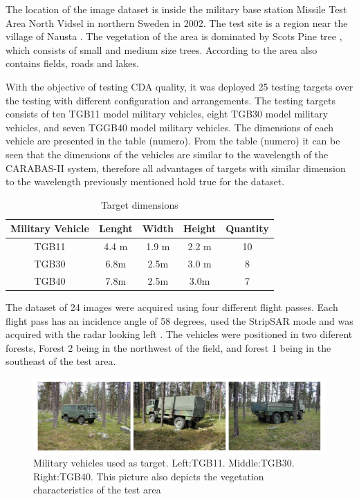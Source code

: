 The location of the image dataset is inside the military base station Missile Test Area North
Vidsel in northern Sweden in 2002. The test site is a region near the village of Nausta \cite{ 75}.
The vegetation of the area is dominated by Scots Pine tree \cite{ 76}, which consists of small and medium size trees.
According to \cite{75} the area also contains fields, roads and lakes.

With the objective of testing CDA quality, it was deployed 25 testing targets over the testing with different configuration 
and arrangements. The testing targets consists of ten TGB11 model military vehicles, eight TGB30 model 
military vehicles, and seven TGGB40 model military vehicles. The dimensions of each vehicle are presented in the table (numero).
From the table (numero) it can be seen that the dimensions of the vehicles are similar to the wavelength of the CARABAS-II system,
therefore all advantages of targets with similar dimension to the wavelength previously mentioned hold true for the dataset.

\begin{table}[h]
    \centering
    \begin{tabular}{|c|c|c|c|c|}
        \hline
        Military Vehicle & Lenght & Width & Height & Quantity \\ \hline
        TGB11 & 4.4 m & 1.9 m & 2.2 m & 10 \\ \hline
        TGB30 & 6.8m & 2.5m & 3.0 m & 8 \\ \hline
        TGB40 & 7.8m & 2.5m & 3.0m & 7 \\ \hline
    \end{tabular}
    \caption{Target dimensions}
    \label{tab:vehicle_dimensions}
\end{table}


The dataset of 24 images were acquired using four different flight passes. Each 
flight pass has an incidence angle of 58 degrees, used the StripSAR mode and was acquired with the radar looking left \cite{ 75,76}.
The vehicles were positioned in two diferent forests, Forest 2 being in the northwest of the field, and forest 1 being in the
southeast of the test area. 

\begin{figure}[h]
    \centering
    \includegraphics{chapter6/carabas_vehicles_fisico.jpg}
    \caption{Military vehicles used as target. Left:TGB11. Middle:TGB30. Right:TGB40. 
    This picture also depicts the vegetation characteristics of the test area}
    \label{fig:veiculos}
\end{figure}

